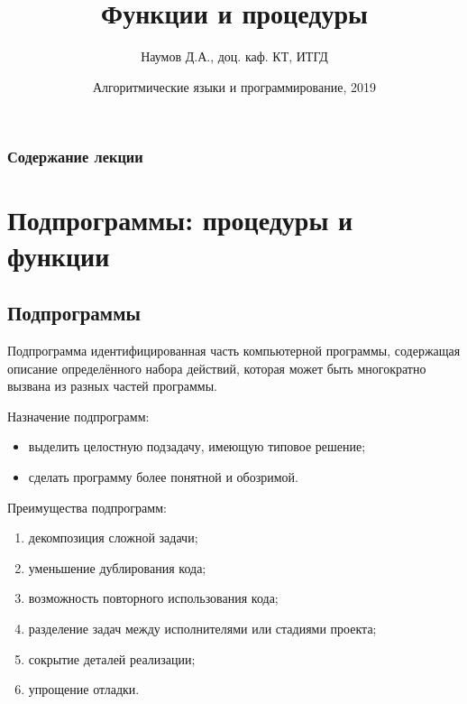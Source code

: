 \documentclass{beamer}
\title[Подпрограммы]{Функции и процедуры}
\author{Наумов Д.А., доц. каф. КТ, ИТГД }
\date[01.04.2019] {Алгоритмические языки и программирование, 2019}
\begin{document}
\begin{frame}
  \titlepage
\end{frame}
  
\begin{frame}
  \frametitle{Содержание лекции}
  \tableofcontents  
\end{frame}
  
\section{Подпрограммы: процедуры и функции}
\subsection{Подпрограммы}
\begin{frame}
\begin{block}{Подпрограмма}
идентифицированная часть компьютерной программы, содержащая описание определённого набора действий, которая может быть многократно вызвана из разных частей программы.
\end{block}
Назначение подпрограмм:
\begin{itemize}
\item выделить целостную подзадачу, имеющую типовое решение;
\item сделать программу более понятной и обозримой.
\end{itemize}
Преимущества подпрограмм:
\begin{enumerate}
\item декомпозиция сложной задачи;
\item уменьшение дублирования кода;
\item возможность повторного использования кода;
\item разделение задач между исполнителями или стадиями проекта;
\item сокрытие деталей реализации;
\item упрощение отладки.
\end{enumerate}
\end{frame} 
\end{document}
